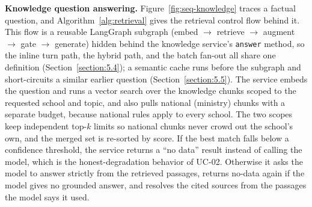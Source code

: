 \documentclass[../main.tex]{subfiles}
\begin{document}
\begin{algorithm}[H]
\caption{Advisory run dispatch (non-blocking, durable queue)}
\label{alg:dispatch}
\end{algorithm}

\textbf{Knowledge question answering.}
Figure~\ref{fig:seq-knowledge} traces a factual question, and Algorithm~\ref{alg:retrieval} gives the retrieval control flow behind it.
This flow is a reusable LangGraph subgraph (embed $\to$ retrieve $\to$ augment $\to$ gate $\to$ generate) hidden behind the knowledge service's \texttt{answer} method, so the inline turn path, the hybrid path, and the batch fan-out all share one definition (Section~\ref{section:5.4}); a semantic cache runs before the subgraph and short-circuits a similar earlier question (Section~\ref{section:5.5}).
The service embeds the question and runs a vector search over the knowledge chunks scoped to the requested school and topic, and also pulls national (ministry) chunks with a separate budget, because national rules apply to every school.
The two scopes keep independent top-$k$ limits so national chunks never crowd out the school's own, and the merged set is re-sorted by score.
If the best match falls below a confidence threshold, the service returns a ``no data'' result instead of calling the model, which is the honest-degradation behavior of UC-02.
Otherwise it asks the model to answer strictly from the retrieved passages, returns no-data again if the model gives no grounded answer, and resolves the cited sources from the passages the model says it used.
\end{document}
